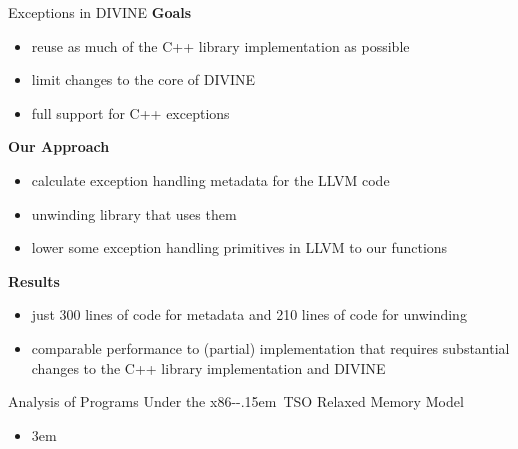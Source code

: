 \documentclass[aspectratio=169]{paradise-slide}
\newcommand{\fcite}[1]{\emergencystretch 3em{\protect\NoHyper\cite{#1}}~\fullcite{#1}}
\newcommand{\xtso}{\mbox{x86-\kern-.15em TSO}\xspace}
\newenvironment{prespart}[1]{%
  \begin{frame}{}%
    \centering
      {\Large #1} \par\bigskip\bigskip%
}{%
  \end{frame}%
}
\begin{document}
\begin{frame}{Exceptions in DIVINE}
  \textbf{Goals}
  \begin{itemize}
    \item reuse as much of the C++ library implementation as possible
    \item limit changes to the core of DIVINE
    \item full support for C++ exceptions
  \end{itemize}
  \pause

  \bigskip
  \textbf{Our Approach}
  \begin{itemize}
    \item calculate exception handling metadata for the LLVM code
    \item unwinding library that uses them
    \item lower some exception handling primitives in LLVM to our functions
  \end{itemize}
  \pause

  \bigskip
  \textbf{Results}
  \begin{itemize}
    \item just 300 lines of code for metadata and 210 lines of code for unwinding
    \item comparable performance to (partial) implementation that requires substantial changes to
      the C++ library implementation and DIVINE
  \end{itemize}
\end{frame}

\begin{prespart}{Analysis of Programs Under the \xtso Relaxed Memory Model}
  \begin{itemize}
    \item \fcite{SB2018x86tso}
  \end{itemize}
\end{prespart}
\end{document}
